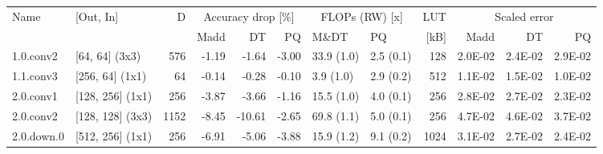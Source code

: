 \begin{table}
\centering
\begin{tabular}{llrrrrllrrrr}
\toprule
Name & [Out, In] & D & \multicolumn{3}{|c|}{Accuracy drop [\%]} & \multicolumn{2}{|c|}{FLOPs (RW) [x]} & LUT & \multicolumn{3}{|c|}{Scaled error} \\
 &  &  & Madd & DT & PQ & M\&DT & PQ & [kB] & Madd & DT & PQ \\
\midrule
1.0.conv2 & [64, 64] (3x3) & 576 & {\cellcolor[HTML]{F5FBB2}} \color[HTML]{000000} -1.19 & {\cellcolor[HTML]{FAFDB8}} \color[HTML]{000000} -1.64 & {\cellcolor[HTML]{FFF8B4}} \color[HTML]{000000} -3.00 & 33.9 (1.0) & 2.5 (0.1) & 128 & {\cellcolor[HTML]{F2FAAE}} \color[HTML]{000000} 2.0E-02 & {\cellcolor[HTML]{FFFEBE}} \color[HTML]{000000} 2.4E-02 & {\cellcolor[HTML]{FEEB9D}} \color[HTML]{000000} 2.9E-02 \\
1.1.conv3 & [256, 64] (1x1) & 64 & {\cellcolor[HTML]{EBF7A3}} \color[HTML]{000000} -0.14 & {\cellcolor[HTML]{ECF7A6}} \color[HTML]{000000} -0.28 & {\cellcolor[HTML]{E9F6A1}} \color[HTML]{000000} -0.10 & 3.9 (1.0) & 2.9 (0.2) & 512 & {\cellcolor[HTML]{C7E77F}} \color[HTML]{000000} 1.1E-02 & {\cellcolor[HTML]{DCF08F}} \color[HTML]{000000} 1.5E-02 & {\cellcolor[HTML]{C1E57B}} \color[HTML]{000000} 1.0E-02 \\
2.0.conv1 & [128, 256] (1x1) & 256 & {\cellcolor[HTML]{FFF1A8}} \color[HTML]{000000} -3.87 & {\cellcolor[HTML]{FFF2AA}} \color[HTML]{000000} -3.66 & {\cellcolor[HTML]{F5FBB2}} \color[HTML]{000000} -1.16 & 15.5 (1.0) & 4.0 (0.1) & 256 & {\cellcolor[HTML]{FFF1A8}} \color[HTML]{000000} 2.8E-02 & {\cellcolor[HTML]{FFF2AA}} \color[HTML]{000000} 2.7E-02 & {\cellcolor[HTML]{FDFEBC}} \color[HTML]{000000} 2.3E-02 \\
2.0.conv2 & [128, 128] (3x3) & 1152 & {\cellcolor[HTML]{FDBD6D}} \color[HTML]{000000} -8.45 & {\cellcolor[HTML]{FA9B58}} \color[HTML]{000000} -10.61 & {\cellcolor[HTML]{FFFBB8}} \color[HTML]{000000} -2.65 & 69.8 (1.1) & 5.0 (0.1) & 256 & {\cellcolor[HTML]{F7844E}} \color[HTML]{F1F1F1} 4.7E-02 & {\cellcolor[HTML]{F88C51}} \color[HTML]{F1F1F1} 4.6E-02 & {\cellcolor[HTML]{FDC776}} \color[HTML]{000000} 3.7E-02 \\
2.0.down.0 & [512, 256] (1x1) & 256 & {\cellcolor[HTML]{FED27F}} \color[HTML]{000000} -6.91 & {\cellcolor[HTML]{FEE797}} \color[HTML]{000000} -5.06 & {\cellcolor[HTML]{FFF1A8}} \color[HTML]{000000} -3.88 & 15.9 (1.2) & 9.1 (0.2) & 1024 & {\cellcolor[HTML]{FEE593}} \color[HTML]{000000} 3.1E-02 & {\cellcolor[HTML]{FFF2AA}} \color[HTML]{000000} 2.7E-02 & {\cellcolor[HTML]{FFFDBC}} \color[HTML]{000000} 2.4E-02 \\

\end{tabular}
\end{table}
